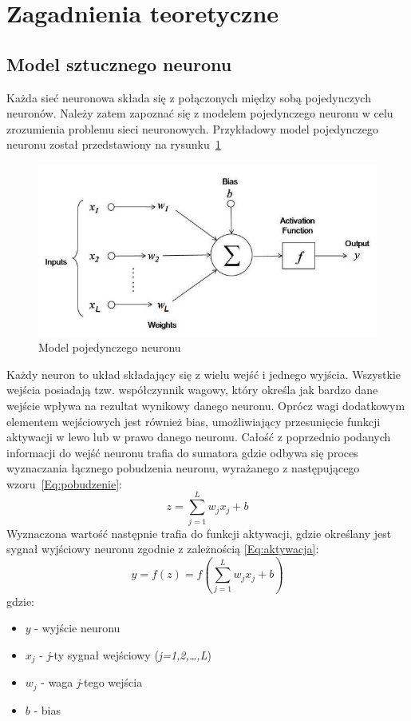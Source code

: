 \documentclass[12pt,twoside]{article}
\begin{document}
\section{Zagadnienia teoretyczne}
\subsection{Model sztucznego neuronu}
Każda sieć neuronowa składa się z połączonych między sobą pojedynczych neuronów. Należy zatem zapoznać się z modelem pojedynczego neuronu w celu zrozumienia problemu sieci neuronowych. Przykładowy model pojedynczego neuronu został przedstawiony na rysunku~\ref{Fig:neuron}
\begin{figure}[ht!]
	\centering
	\includegraphics[width=12cm]{figures/model_neuronu.png}
	\caption{Model pojedynczego neuronu}
	\label{Fig:neuron}
\end{figure}

Każdy neuron to układ składający się z wielu wejść i jednego wyjścia. Wszystkie wejścia posiadają tzw. współczynnik wagowy, który określa jak bardzo dane wejście wpływa na rezultat wynikowy danego neuronu. Oprócz wagi dodatkowym elementem wejściowych jest również bias, umożliwiający przesunięcie funkcji aktywacji w lewo lub w prawo danego neuronu.
Całość z poprzednio podanych informacji do wejść neuronu trafia do sumatora gdzie odbywa się proces wyznaczania łącznego pobudzenia
neuronu, wyrażanego z następującego wzoru~\ref{Eq:pobudzenie}:
\begin{equation}
	z = \sum_{j=1}^{L} w_{j}x_{j}+b
	\label{Eq:pobudzenie}
\end{equation}
Wyznaczona wartość następnie trafia do funkcji aktywacji, gdzie określany jest sygnał wyjściowy neuronu zgodnie z zależnością \ref{Eq:aktywacja}:
\newpage
\begin{equation}
	y = f(z) = f(\sum_{j=1}^{L} w_{j}x_{j}+b)
	\label{Eq:aktywacja}
\end{equation}
gdzie:
\begin{itemize}
	\item $y$ - wyjście neuronu
	\item $x_{j}$ - \textit{j}-ty sygnał wejściowy (\textit{j=1,2,\dots,L})
	\item $w_{j}$ - waga \textit{j}-tego wejścia
	\item $b$ - bias
\end{itemize}
\end{document}
